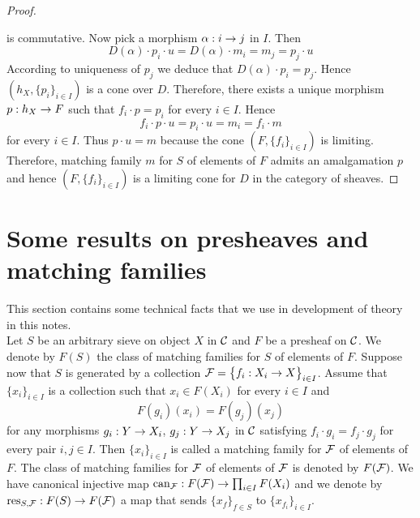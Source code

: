 \begin{proof}
\begin{center}
\end{center}
is commutative. Now pick a morphism $\alpha:i\rightarrow j$ in $I$. Then 
$$D(\alpha)\cdot p_i\cdot u = D(\alpha)\cdot m_i = m_j = p_j\cdot u$$
According to uniqueness of $p_j$ we deduce that $D(\alpha)\cdot p_i = p_j$. Hence $\left(h_X,\big\{p_i\big\}_{i\in I}\right)$ is a cone over $D$. Therefore, there exists a unique morphism $p:h_X\rightarrow F$ such that $f_i\cdot p = p_i$ for every $i\in I$. Hence 
$$f_i\cdot p\cdot u=p_i\cdot u= m_i = f_i\cdot m$$
for every $i\in I$. Thus $p\cdot u = m$ because the cone $\left(F,\big\{f_i\big\}_{i\in I}\right)$ is limiting. Therefore, matching family $m$ for $S$ of elements of $F$ admits an amalgamation $p$ and hence $\left(F,\big\{f_i\big\}_{i\in I}\right)$ is a limiting cone for $D$ in the category of sheaves. 
\end{proof}

\section{Some results on presheaves and matching families}
\noindent
This section contains some technical facts that we use in development of theory in this notes.\\
Let $S$ be an arbitrary sieve on object $X$ in ${\mathcal C}$ and $F$ be a presheaf on ${\mathcal C}$. We denote by $F(S)$ the class of matching families for $S$ of elements of $F$. Suppose now that $S$ is generated by a collection ${\mathcal F} = \big\{f_i:X_i\rightarrow X\big\}_{i\in I}$. Assume that $\{x_i\}_{i\in I}$ is a collection such that $x_i\in F(X_i)$ for every $i\in I$ and
$$F(g_i)(x_i) = F(g_j)(x_j)$$
for any morphisms $g_i:Y\rightarrow X_i$, $g_j:Y\rightarrow X_j$ in ${\mathcal C}$ satisfying $f_i\cdot g_i = f_j\cdot g_j$ for every pair $i,j\in I$. Then $\{x_i\}_{i\in I}$ is called a matching family for ${\mathcal F}$ of elements of $F$. The class of matching families for ${\mathcal F}$ of elements of ${\mathcal F}$ is denoted by $F({\mathcal F})$. We have canonical injective map $\mathrm{can}_{{\mathcal F}}:F({\mathcal F})\rightarrow \prod_{i\in I}F(X_i)$ and we denote by $\mathrm{res}_{S,{\mathcal F}}:F(S)\rightarrow F({\mathcal F})$ a map that sends $\{x_f\}_{f\in S}$ to $\{x_{f_i}\}_{i\in I}$.

